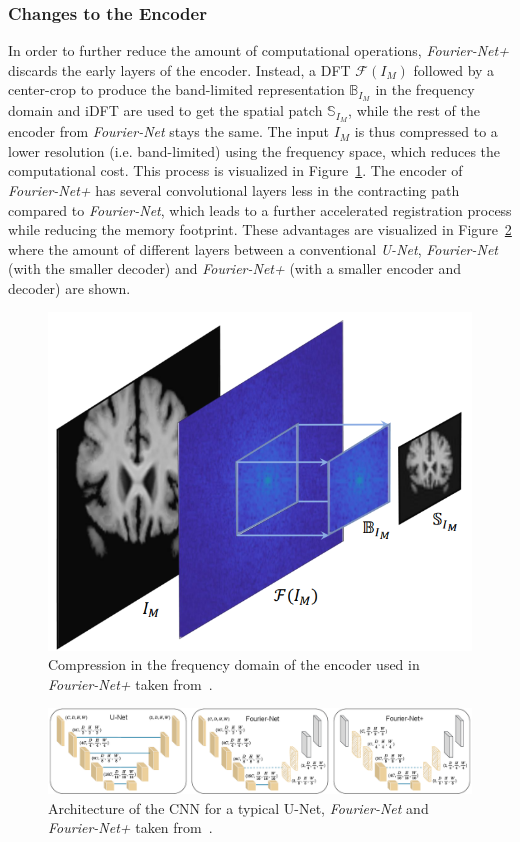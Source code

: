 \subsubsection{Changes to the Encoder} \label{SubSubSec:ChangesEncoder}
In order to further reduce the amount of computational operations, \emph{Fourier-Net+} discards the early layers of the encoder. Instead, a DFT $\mathcal{F}(I_M)$ followed by a center-crop to produce the band-limited representation $\mathbb{B}_{I_M}$ in the frequency domain and iDFT are used to get the spatial patch $\mathbb{S}_{I_M}$, while the rest of the encoder from \emph{Fourier-Net} stays the same. The input $I_M$ is thus compressed to a lower resolution (i.e. band-limited) using the frequency space, which reduces the computational cost. This process is visualized in Figure~\ref{fig:Fourier-Net+EncoderCompression}. The encoder of \emph{Fourier-Net+} has several convolutional layers less in the contracting path compared to \emph{Fourier-Net}, which leads to a further accelerated registration process while reducing the memory footprint. These advantages are visualized in Figure~\ref{fig:Fourier-Net+CNN} where the amount of different layers between a conventional \emph{U-Net}, \emph{Fourier-Net} (with the smaller decoder) and \emph{Fourier-Net+} (with a smaller encoder and decoder) are shown.
\begin{figure}[h] %
	\centering
	\graphicspath{{images/}{\main/images/}}
	\includegraphics[width=.5\linewidth]{CompressionEncoder.png} 
	\caption{Compression in the frequency domain of the encoder used in \emph{Fourier-Net+} taken from~\cite{Fourier-Net+}.}
	\label{fig:Fourier-Net+EncoderCompression}
\end{figure}
\begin{figure}[h] %
	\centering
	\graphicspath{{images/}{\main/images/}}
	\includegraphics[width=\linewidth]{ArchitectureFourier-Net+CNN.png} 
	\caption{Architecture of the CNN for a typical U-Net, \emph{Fourier-Net} and \emph{Fourier-Net+} taken from~\cite{Fourier-Net+}.}
	\label{fig:Fourier-Net+CNN}
\end{figure}

